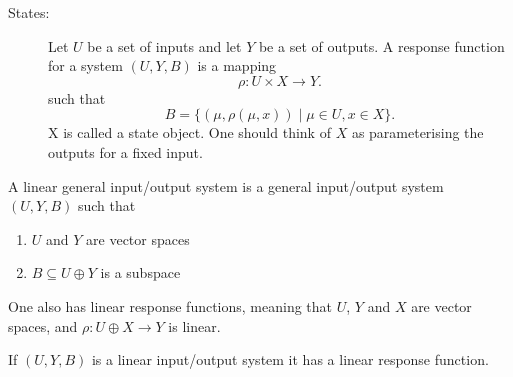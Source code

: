 	\begin{description}
		\item[States:] Let $U$ be a set of inputs and let $Y$ be a set of outputs. A response function for a system $(U, Y, B)$ is a mapping 	\[
			 \rho : U \times  X  \to Y 
			.\] such that \[
			B = \{(\mu, \rho (\mu, x))  \mid \mu \in  U, x \in  X \}
			.\]
		X is called a state object. One should think of $X$ as parameterising the outputs for a fixed input. 
			
	\end{description}
	\begin{definition}
	A linear general input/output system is a general input/output system $(U, Y, B)$ such that 
	\begin{enumerate}
		\item $U$ and $Y$ are vector spaces 
		\item $B  \subseteq U \oplus Y$ is a subspace
	\end{enumerate}	
	\end{definition}
	One also has linear response functions, meaning that $U$, $Y$ and $X$ are vector spaces, and $ \rho : U \oplus X  \to Y $ is linear. 

	\begin{conclusion}
		If $(U, Y, B)$ is a linear input/output system it has a linear response function.
	\end{conclusion}
